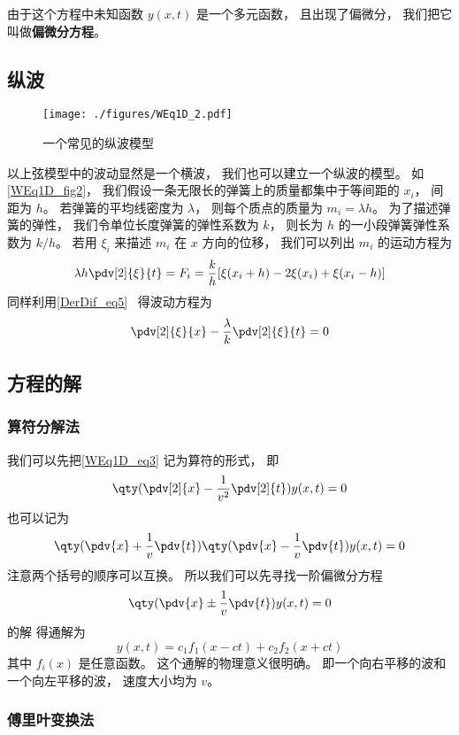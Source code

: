 由于这个方程中未知函数 $y(x,t)$ 是一个多元函数， 且出现了偏微分， 我们把它叫做\textbf{偏微分方程}。

\subsection{纵波}

\begin{figure}[ht]
\centering
\texttt{[image: ./figures/WEq1D\_2.pdf]}
\caption{一个常见的纵波模型} \label{WEq1D_fig2}
\end{figure}

以上弦模型中的波动显然是一个横波， 我们也可以建立一个纵波的模型。 如\autoref{WEq1D_fig2}， 我们假设一条无限长的弹簧上的质量都集中于等间距的 $x_i$， 间距为 $h$。 若弹簧的平均线密度为 $\lambda$， 则每个质点的质量为 $m_i = \lambda h$。 为了描述弹簧的弹性， 我们令单位长度弹簧的弹性系数为 $k$， 则长为 $h$ 的一小段弹簧弹性系数为 $k/h$。 若用 $\xi_i$ 来描述 $m_i$ 在 $x$ 方向的位移， 我们可以列出 $m_i$ 的运动方程为
\begin{equation}
\lambda h \pdv[2]{\xi}{t} = F_i = \frac kh [\xi(x_i + h) - 2\xi(x_i) + \xi(x_i - h)]
\end{equation}
同样利用\autoref{DerDif_eq5}~ 得波动方程为
\begin{equation}
\pdv[2]{\xi}{x} - \frac{\lambda}{k}\pdv[2]{\xi}{t} = 0
\end{equation}

\subsection{方程的解}

\subsubsection{算符分解法}
我们可以先把\autoref{WEq1D_eq3} 记为算符的形式， 即
\begin{equation}
\qty(\pdv[2]{x} - \frac{1}{v^2}\pdv[2]{t}) y(x, t) = 0
\end{equation}
也可以记为
\begin{equation}
\qty(\pdv{x} + \frac{1}{v}\pdv{t})\qty(\pdv{x} - \frac{1}{v}\pdv{t}) y(x, t) = 0
\end{equation}
注意两个括号的顺序可以互换。 所以我们可以先寻找一阶偏微分方程
\begin{equation}
\qty(\pdv{x}  \pm\frac{1}{v}\pdv{t})y(x, t)  = 0
\end{equation}
的解%
得通解为
\begin{equation}
y(x, t) = c_1 f_1(x - ct) + c_2 f_2(x + ct)
\end{equation}
其中 $f_i(x)$ 是任意函数。 这个通解的物理意义很明确。 即一个向右平移的波和一个向左平移的波， 速度大小均为 $v$。

\subsubsection{傅里叶变换法}
